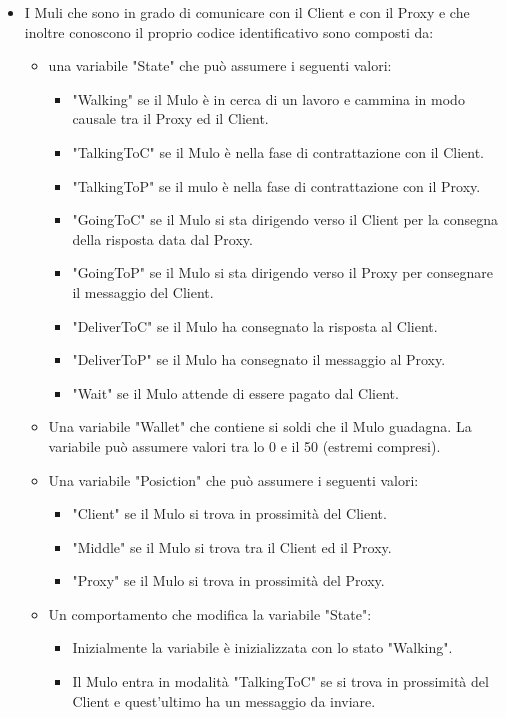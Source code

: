 \documentclass[13pt,a4paper]{article}
\begin{document}
\begin{itemize}
		
		\item I Muli che sono in grado di comunicare con il Client e con il Proxy e che  inoltre conoscono il proprio codice identificativo sono composti da:
		\begin{itemize}
			\item una variabile "State" che può assumere i seguenti valori:
			\begin{itemize}
				\item "Walking" se il Mulo è in cerca di un lavoro e cammina in modo causale tra il Proxy ed il Client.
				\item "TalkingToC" se il Mulo è nella fase di contrattazione con il Client.
				\item "TalkingToP" se il mulo è nella fase di contrattazione con il Proxy.
				\item "GoingToC" se il Mulo si sta dirigendo verso il Client per la consegna della risposta data dal Proxy.
				\item "GoingToP" se il Mulo si sta dirigendo verso il Proxy per consegnare il messaggio del Client.
				\item "DeliverToC" se il Mulo ha consegnato la risposta al Client.
				\item "DeliverToP" se il Mulo ha consegnato il messaggio al Proxy.
				\item "Wait" se il Mulo attende di essere pagato dal Client.
			\end{itemize}
		\item Una variabile "Wallet" che contiene si soldi che il Mulo guadagna.  La variabile può assumere valori tra lo 0 e il 50 (estremi compresi).
		\item Una variabile "Posiction" che può assumere i seguenti valori:
		\begin{itemize}
			\item "Client" se il Mulo si trova in prossimità del Client.
			\item "Middle" se il Mulo si trova tra il Client ed il Proxy.
			\item "Proxy" se il Mulo si trova in prossimità del Proxy.
		\end{itemize}
	\item Un comportamento che modifica la variabile "State":
	\begin{itemize}
		\item Inizialmente la variabile è inizializzata con lo stato "Walking".
		\item Il Mulo entra in modalità "TalkingToC" se si trova in prossimità del Client e quest'ultimo ha un messaggio da inviare.

\end{itemize}
\end{itemize}
\end{itemize}
\end{document}
